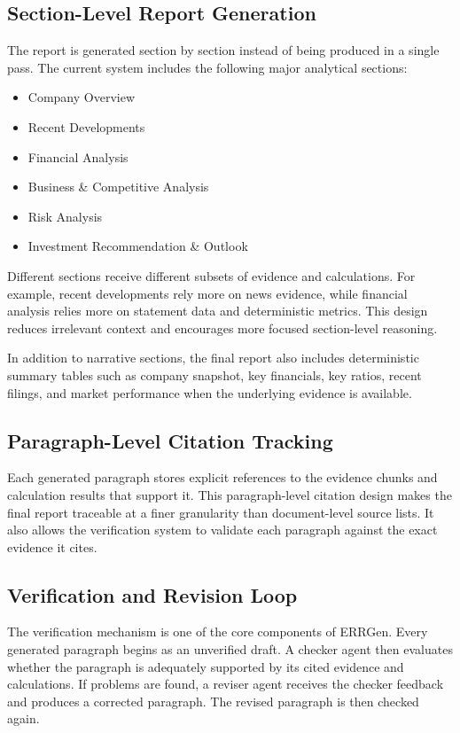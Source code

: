\documentclass[11pt,a4paper]{article}
\begin{document}
\subsection{Section-Level Report Generation}
The report is generated section by section instead of being produced in a
single pass. The current system includes the following major analytical
sections:
\begin{itemize}[leftmargin=1.5em]
    \item Company Overview
    \item Recent Developments
    \item Financial Analysis
    \item Business \& Competitive Analysis
    \item Risk Analysis
    \item Investment Recommendation \& Outlook
\end{itemize}

Different sections receive different subsets of evidence and calculations. For
example, recent developments rely more on news evidence, while financial
analysis relies more on statement data and deterministic metrics. This design
reduces irrelevant context and encourages more focused section-level reasoning.

In addition to narrative sections, the final report also includes deterministic
summary tables such as company snapshot, key financials, key ratios, recent
filings, and market performance when the underlying evidence is available.

\subsection{Paragraph-Level Citation Tracking}
Each generated paragraph stores explicit references to the evidence chunks and
calculation results that support it. This paragraph-level citation design makes
the final report traceable at a finer granularity than document-level source
lists. It also allows the verification system to validate each paragraph
against the exact evidence it cites.

\subsection{Verification and Revision Loop}
The verification mechanism is one of the core components of ERRGen. Every
generated paragraph begins as an unverified draft. A checker agent then
evaluates whether the paragraph is adequately supported by its cited evidence
and calculations. If problems are found, a reviser agent receives the checker
feedback and produces a corrected paragraph. The revised paragraph is then
checked again.
\end{document}
